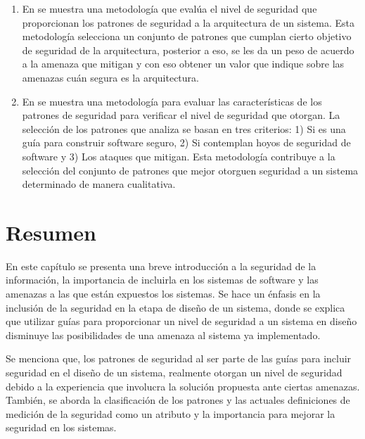 \begin{enumerate}[noitemsep]
	\item En \cite{YauScaHey} se muestra una metodología que evalúa el nivel de seguridad que proporcionan los patrones de seguridad a la arquitectura de un sistema. Esta metodología selecciona un conjunto de patrones que cumplan cierto objetivo de seguridad de la arquitectura, posterior a eso, se les da un peso de acuerdo a la amenaza que mitigan y con eso obtener un valor que indique sobre las amenazas cuán segura es la arquitectura.
	\item En \cite{HalChaSte06} se muestra una metodología para evaluar las características de los patrones de seguridad para verificar el nivel de seguridad que otorgan. La selección de los patrones que analiza se basan en  tres criterios: 1) Si es una guía para construir software seguro, 2) Si contemplan hoyos de seguridad de software y 3) Los ataques que mitigan. Esta metodología contribuye a la selección del conjunto de patrones que mejor otorguen seguridad a un sistema determinado de manera cualitativa. 
\end{enumerate}

\section{Resumen}

En este capítulo se presenta una breve introducción a la seguridad de la información, la importancia de incluirla en los sistemas de software y las amenazas a las que están expuestos los sistemas. Se hace un énfasis en la inclusión de la seguridad en la etapa de diseño de un sistema, donde se explica que utilizar guías para proporcionar un nivel de seguridad a un sistema en diseño disminuye las posibilidades de una amenaza al sistema ya implementado. 

\vspace{0.3cm}

Se menciona que, los patrones de seguridad al ser parte de las guías para incluir seguridad en el diseño de un sistema, realmente otorgan un nivel de seguridad debido a la experiencia que involucra la solución propuesta ante ciertas amenazas. También, se aborda la clasificación de los patrones y las actuales definiciones de medición de la seguridad como un atributo y la importancia para mejorar la seguridad en los sistemas. 


